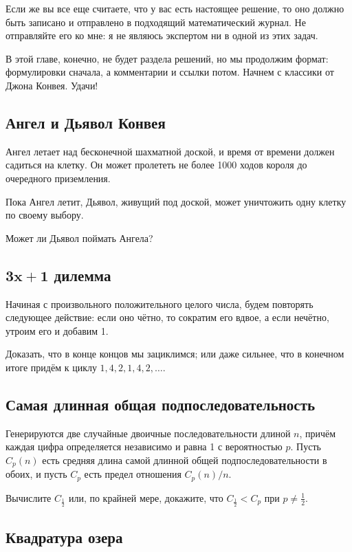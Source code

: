 Если же вы все еще считаете, что у вас есть настоящее решение, то оно должно быть записано и отправлено в подходящий математический журнал.
Не отправляйте его ко мне: я не являюсь экспертом ни в одной из этих задач.

\medskip

В этой главе, конечно, не будет раздела решений, но мы продолжим формат: формулировки сначала, а комментарии и ссылки потом.
Начнем с классики от Джона Конвея.
Удачи!


\subsection*{Ангел и Дьявол Конвея}

Ангел летает над бесконечной шахматной доской, и время от времени должен садиться на клетку.
Он может пролететь не более 1000 ходов короля до очередного приземления.

Пока Ангел летит, Дьявол, живущий под доской, может уничтожить одну клетку по своему выбору.

Может ли Дьявол поймать Ангела?

\subsection*{$\bm{3x+1}$ дилемма}

Начиная с произвольного положительного целого числа, будем повторять следующее действие: если оно чётно, то сократим его вдвое, а если нечётно, утроим его и добавим 1.

Доказать, что в конце концов мы зациклимся; или даже сильнее, что в конечном итоге придём к циклу $1, 4, 2, 1, 4, 2,\dots$.

\subsection*{Самая длинная общая подпоследовательность}
Генерируются две случайные двоичные последовательности длиной $n$, причём каждая цифра определяется независимо и равна 1 с вероятностью $p$.
Пусть $C_p(n)$ есть средняя длина самой длинной общей подпоследовательности в обоих, и пусть $C_p$ есть предел отношения $C_p(n)/n$.

Вычислите $C_{\frac12}$ или, по крайней мере, докажите, что $C_{\frac12}<C_{p}$ при $p\ne\tfrac12$.

\subsection*{Квадратура озера}

